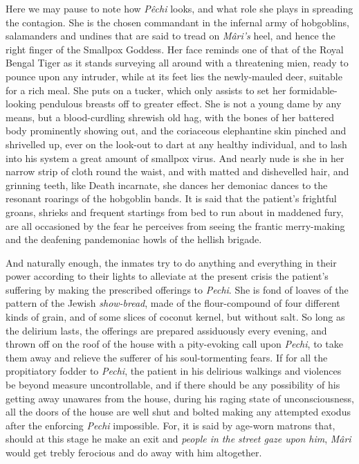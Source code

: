 \documentclass[a4paper, 12pt, oneside, english, twocolumn]{article}
\begin{document}
Here we may pause to note how \emph{Pêchi} looks, and what role she plays in spreading the contagion. She is the chosen commandant in the infernal army of hobgoblins, salamanders and undines that are said to tread on \emph{Mâri's} heel, and hence the right finger of the Smallpox Goddess. Her face reminds one of that of the Royal Bengal Tiger as it stands surveying all around with a threatening mien, ready to pounce upon any intruder, while at its feet lies the newly-mauled deer, suitable for a rich meal. She puts on a tucker, which only assists to set her formidable-looking pendulous breasts off to greater effect. She is not a young dame by any means, but a blood-curdling shrewish old hag, with the bones of her battered body prominently showing out, and the coriaceous elephantine skin pinched and shrivelled up, ever on the look-out to dart at any healthy individual, and to lash into his system a great amount of smallpox virus. And nearly nude is she in her narrow strip of cloth round the waist, and with matted and dishevelled hair, and grinning teeth, like Death incarnate, she dances her demoniac dances to the resonant roarings of the hobgoblin bands. It is said that the patient's frightful groans, shrieks and frequent startings from bed to run about in maddened fury, are all occasioned by the fear he perceives from seeing the frantic merry-making and the deafening pandemoniac howls of the hellish brigade.

And naturally enough, the inmates try to do anything and everything in their power according to their lights to alleviate at the present crisis the patient's suffering by making the prescribed offerings to \emph{Pechi}. She is fond of loaves of the pattern of the Jewish \emph{show-bread}, made of the flour-compound of four different kinds of grain, and of some slices of coconut kernel, but without salt. So long as the delirium lasts, the offerings are prepared assiduously every evening, and thrown off on the roof of the house with a pity-evoking call upon \emph{Pechi}, to take them away and relieve the sufferer of his soul-tormenting fears. If for all the propitiatory fodder to \emph{Pechi}, the patient in his delirious walkings and violences be beyond measure uncontrollable, and if there should be any possibility of his getting away unawares from the house, during his raging state of unconsciousness, all the doors of the house are well shut and bolted making any attempted exodus after the enforcing \emph{Pechi} impossible. For, it is said by age-worn matrons that, should at this stage he make an exit and \emph{people in the street gaze upon him}, \emph{Mâri} would get trebly ferocious and do away with him altogether.
\end{document}
